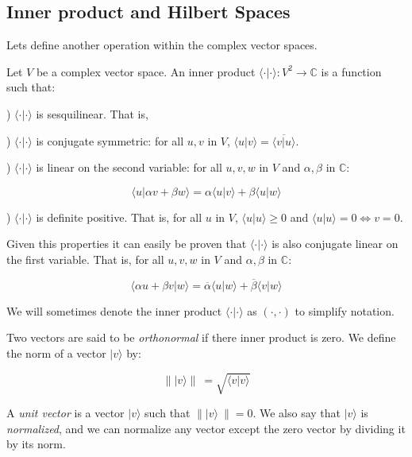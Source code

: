 \subsection{Inner product and Hilbert Spaces}


Lets define another operation within the complex vector spaces.

\begin{definition}
	Let $V$ be a complex vector space. An inner product $\langle \cdot | \cdot \rangle: V^2 \rightarrow \mathds{C}$ is a function such that:
	
	) $\langle \cdot | \cdot \rangle$ is sesquilinear. That is,
	
	) $\langle \cdot | \cdot \rangle$ is conjugate symmetric: for all $u,v$ in $V$, $\langle u | v \rangle = \overline{\langle v | u \rangle}$.
	
	) $\langle \cdot | \cdot \rangle$ is linear on the second variable: for all $u,v,w$ in $V$ and $\alpha, \beta$ in $\mathds{C}$:
	
	$$ \langle u  | \alpha v + \beta w \rangle = \alpha \langle u | v \rangle + \beta \langle u | w \rangle $$
	
	) $\langle \cdot | \cdot \rangle$ is definite positive. That is, for all $u$ in $V$, $\langle u | u \rangle \geq 0$ and $\langle u | u \rangle = 0 \Longleftrightarrow v = 0$.
\end{definition}

Given this properties it can easily be proven that $\langle \cdot | \cdot \rangle$ is also conjugate linear on the first variable. That is, for all $u,v,w$ in $V$ and $\alpha, \beta$ in $\mathds{C}$:

$$ \langle \alpha u + \beta v  | w \rangle = \overline{\alpha} \langle u | w \rangle + \overline{\beta} \langle v | w \rangle $$

We will sometimes denote the inner product $\langle \cdot | \cdot \rangle$ as $( \cdot , \cdot )$ to simplify notation.

Two vectors are said to be \emph{orthonormal} if there inner product is zero. We define the norm of a vector $|v\rangle$ by:

$$\parallel |v\rangle \parallel \ = \sqrt{ \langle v|v\rangle }$$

A \emph{unit vector} is a vector $|v\rangle$ such that $\parallel |v\rangle \  \parallel = 0 $. We also say that $|v\rangle$ is \emph{normalized}, and we can normalize any vector except the zero vector by dividing it by its norm.

